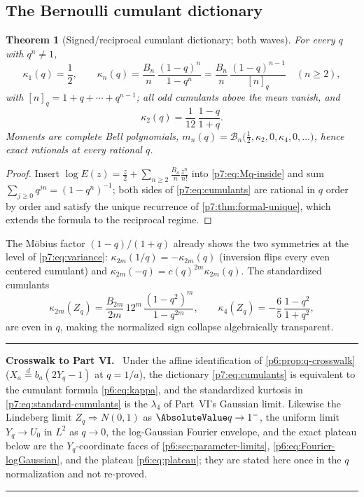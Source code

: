 \documentclass[11pt,oneside]{article}
\numberwithin{equation}{section}
\newtheorem{theorem}{Theorem}[section]
\theoremstyle{definition}
\theoremstyle{remark}
\newcommand{\Bell}{\mathcal B}
\newenvironment{statusbox}[1]{%
  \par\medskip\noindent\begin{center}\begin{minipage}{0.94\textwidth}%
  \color{linkblue}\hrule\vspace{0.65em}%
  \color{black}\textbf{\color{linkblue}#1.}\ }{%
  \par\vspace{0.65em}\color{linkblue}\hrule
  \end{minipage}\end{center}\medskip}
\begin{document}
\subsection{The Bernoulli cumulant dictionary}

\begin{theorem}[Signed/reciprocal cumulant dictionary; both waves]
\label{p7:thm:cumulants}
For every $q$ with $q^n\ne1$,
\begin{equation}\label{p7:eq:cumulants}
 \boxed{\ \kappa_1(q)=\frac12,
 \qquad
 \kappa_n(q)=\frac{B_n}{n}\,\frac{(1-q)^n}{1-q^n}
 =\frac{B_n}{n}\,\frac{(1-q)^{n-1}}{[n]_q}
 \quad(n\ge2),\ }
\end{equation}
with $[n]_q=1+q+\cdots+q^{n-1}$; all odd cumulants above the mean vanish, and
\begin{equation}\label{p7:eq:variance}
 \kappa_2(q)=\frac1{12}\,\frac{1-q}{1+q}.
\end{equation}
Moments are complete Bell polynomials,
$m_n(q)=\Bell_n\bigl(\tfrac12,\kappa_2,0,\kappa_4,0,\ldots\bigr)$, hence exact
rationals at every rational $q$.
\end{theorem}

\begin{proof}
Insert $\log E(z)=\tfrac z2+\sum_{n\ge2}\tfrac{B_n}{n}\tfrac{z^n}{n!}$ into
\eqref{p7:eq:Mq-inside} and sum $\sum_{j\ge0}q^{jn}=(1-q^n)^{-1}$; both sides
of \eqref{p7:eq:cumulants} are rational in $q$ order by order and satisfy the
unique recurrence of \cref{p7:thm:formal-unique}, which extends the formula to
the reciprocal regime.
\end{proof}

The M\"obius factor $(1-q)/(1+q)$ already shows the two symmetries at the
level of \eqref{p7:eq:variance}: $\kappa_{2m}(1/q)=-\kappa_{2m}(q)$ (inversion
flips every even centered cumulant) and
$\kappa_{2m}(-q)=c(q)^{2m}\kappa_{2m}(q)$.  The standardized cumulants
\begin{equation}\label{p7:eq:standard-cumulants}
 \kappa_{2m}(Z_q)=\frac{B_{2m}}{2m}\,12^m\,
 \frac{(1-q^2)^m}{1-q^{2m}},
 \qquad
 \kappa_4(Z_q)=-\frac65\,\frac{1-q^2}{1+q^2},
\end{equation}
are even in $q$, making the normalized sign collapse algebraically
transparent.

\begin{statusbox}{Crosswalk to Part VI}
Under the affine identification of \cref{p6:prop:q-crosswalk}
($X_a\overset d=b_a(2Y_q-1)$ at $q=1/a$), the dictionary
\eqref{p7:eq:cumulants} is equivalent to the cumulant formula
\eqref{p6:eq:kappa}, and the standardized kurtosis in
\eqref{p7:eq:standard-cumulants} is the $\lambda_4$ of Part~VI's Gaussian
limit.  Likewise the Lindeberg limit $Z_q\Rightarrow N(0,1)$ as
$\AbsoluteValue q\to1^-$, the uniform limit $Y_q\to U_0$ in $L^2$ as $q\to0$, the
log-Gaussian Fourier envelope, and the exact plateau below are the
$Y_q$-coordinate faces of \cref{p6:sec:parameter-limits},
\cref{p6:eq:Fourier-logGaussian}, and the plateau
\eqref{p6:eq:plateau}; they are stated here once in the $q$ normalization and
not re-proved.
\end{statusbox}
\end{document}
